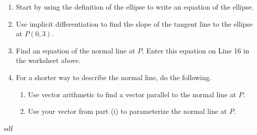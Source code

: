 \documentclass{ximera}
\begin{document}
\begin{question}
\begin{enumerate}
\item Start by using the definition of the ellipse to write an equation of the ellipse.

\item Use implicit differentiation to find the slope of the tangent line to the ellipse at $P(0,3)$.

\item Find an equation of the normal line at $P$. Enter this equation on Line 16 in the worksheet above. 

\item For a shorter way to describe the normal line, do the following.

\begin{enumerate}
\item Use vector arithmetic to find a vector parallel to the normal line at $P$.

\item Use your vector from part (i) to parameterize the normal line at $P$.

\end{enumerate}
\end{enumerate}
\end{question}


\begin{question}  \label{Q5445rggfbhyhyrdt}
sdf
\end{question}
\end{document}
